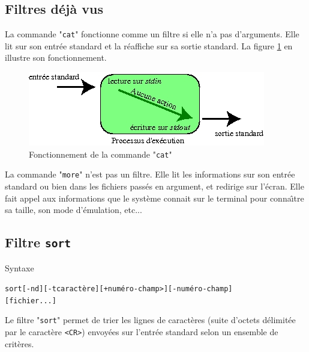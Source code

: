 \subsection{Filtres d{\'e}j{\`a} vus}

La commande "{\tt  cat}" fonctionne comme un filtre si elle n'a pas
d'arguments. Elle lit sur son entr{\'e}e standard et la r{\'e}affiche sur sa
sortie standard. La figure \ref{fig-cmds-cat} en illustre son fonctionnement.

\begin{figure}[hbtp]
\centering
\includegraphics{./_Images/cmds-unix/cat.jpg}
\caption{\label{fig-cmds-cat}Fonctionnement de la commande "{\tt cat}"}
\end{figure}

\begin{remarque}
La commande "{\tt more}" n'est pas un filtre. Elle lit les
informations sur son entr{\'e}e standard ou bien dans les fichiers pass{\'e}s en
argument, et redirige sur l'{\'e}cran. Elle fait appel aux informations que
le syst{\`e}me connait sur le terminal pour conna{\^\i}tre sa taille, son mode
d'{\'e}mulation, etc{...}
\end{remarque}

\subsection{Filtre {\tt sort}}

\begin{definition}{Syntaxe}
\begin{alltt}
sort [-nd] [-tcaract{\`e}re] [+num{\'e}ro-champ>] [-num{\'e}ro-champ]
            [fichier...]
\end{alltt}
\end{definition}

Le filtre "{\tt sort}" permet de trier les lignes de caract{\`e}res (suite
d'octets d{\'e}limit{\'e}e par le caract{\`e}re \verb=<CR>=) envoy{\'e}es sur l'entr{\'e}e standard
selon un ensemble de crit{\`e}res.

